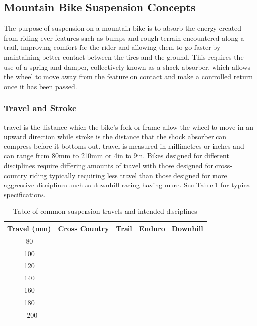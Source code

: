 	\subsection{Mountain Bike Suspension Concepts}
		The purpose of suspension on a mountain bike is to absorb the energy created from riding over features such as bumps and rough terrain encountered along a trail, improving comfort for the rider and allowing them to go faster by maintaining better contact between the tires and the ground. This requires the use of a spring and damper, collectively known as a shock absorber, which allows the wheel to move away from the feature on contact and make a controlled return once it has been passed.
	\subsubsection{Travel and Stroke}
		\Gls{travel} is the distance which the bike’s fork or frame allow the wheel to move in an upward direction while \gls{stroke} is the distance that the shock absorber can compress before it bottoms out. \Gls{travel} is measured in millimetres or inches and can range from 80mm to 210mm or 4in to 9in. Bikes designed for different disciplines require differing amounts of travel with those designed for cross-country riding typically requiring less travel than those designed for more aggressive disciplines such as downhill racing having more. See Table \ref{tab:travel} for typical specifications.
		\begin{table}[h!]
		\centering
		\caption{Table of common suspension \glspl{travel} and intended disciplines}
		\label{tab:travel}
		\begin{tabular}{|c|cccc|}
			\hline
			Travel (mm)&Cross Country&Trail&Enduro&Downhill\\
			\hline
			80&\cellcolor[gray]{0.5}&&&
			\\
			100&\cellcolor[gray]{0.5}&&&
			\\
			120&\cellcolor[gray]{0.5}&\cellcolor[gray]{0.5}&&
			\\
			140&&\cellcolor[gray]{0.5}&\cellcolor[gray]{0.5}&
			\\
			160&&&\cellcolor[gray]{0.5}&
			\\
			180&&&\cellcolor[gray]{0.5}&\cellcolor[gray]{0.5}
			\\
			+200&&&&\cellcolor[gray]{0.5}\\
			\hline
		\end{tabular}
	\end{table}
